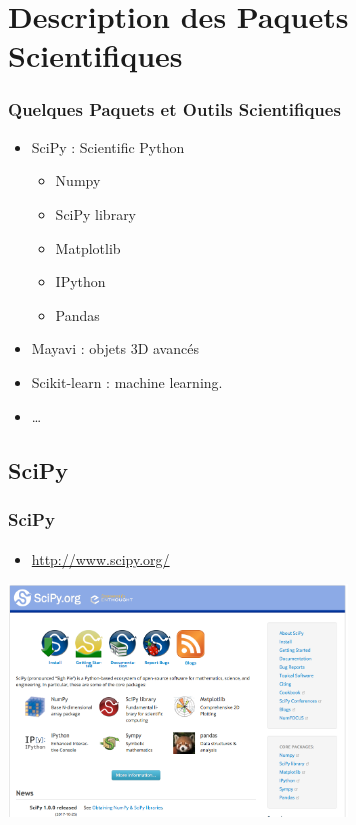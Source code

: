\section{Description des Paquets Scientifiques}
\begin{frame}[fragile]
\frametitle{Quelques Paquets et Outils Scientifiques}
\begin{itemize}
 \item SciPy : Scientific Python 
 \begin{itemize}
  \item Numpy
  \item SciPy library
  \item Matplotlib
  \item IPython
  \item Pandas
 \end{itemize}
 \item Mayavi : objets 3D avancés
 \item Scikit-learn : machine learning.
 \item \dots
\end{itemize}
\end{frame}
\subsection{SciPy}
\begin{frame}[fragile]
\frametitle{SciPy}
\framesubtitle{}
\begin{itemize}
 \item \url{http://www.scipy.org/}
\end{itemize}
\begin{center}
\includegraphics[width=9cm]{./fig/scipy.png}
\end{center}
\end{frame}
